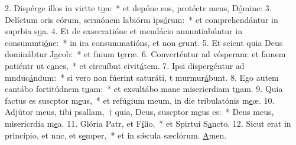 2. Dispérge illos in virtte t\uline{u}a:~* et depóne eos, protéctr meus, D\uline{ó}mine:
3. Delíctum oris eórum, sermónem labiórm ips\uline{ó}rum:~* et comprehendántur in suprbia s\uline{u}a.
4. Et de exsecratióne et mendácio annuntiabúntur in consummti\uline{ó}ne:~* in ira consummatións, et non \uline{e}runt.
5. Et scient quia Deus dominábtur J\uline{a}cob:~* et fnium t\uline{e}rræ.
6. Converténtur ad vésperam: et famem patiéntr ut c\uline{a}nes,~* et circuíbnt civit\uline{á}tem.
7. Ipsi dispergéntur ad mnduc\uline{á}ndum:~* si vero non fúerint saturáti, t murmur\uline{á}bunt.
8. Ego autem cantábo fortitúdnem t\uline{u}am:~* et exsultábo mane misericrdiam t\uline{u}am.
9. Quia factus es suscptor m\uline{e}us,~* et refúgium meum, in die tribulatónis m\uline{e}æ.
10. Adjútor meus, tibi psallam,~† quia, Deus, suscptor m\uline{e}us es:~* Deus meus, misericrdia m\uline{e}a.
11. Glória Patr, et F\uline{í}lio,~* et Spirtui S\uline{a}ncto.
12. Sicut erat in princípio, et nnc, et s\uline{e}mper,~* et in sǽcula sæclórum. \uline{A}men.
